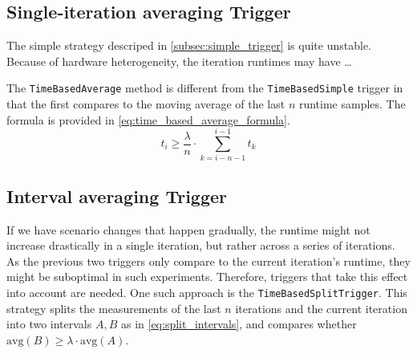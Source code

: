 \subsection{Single-iteration averaging Trigger}
The simple strategy descriped in \autoref{subsec:simple_trigger} is quite unstable. Because of hardware heterogeneity, the iteration runtimes may have …\textellipsis %

The \texttt{TimeBasedAverage} method is different from the \texttt{TimeBasedSimple} trigger in that the first compares to the  moving average of the last $n$ runtime samples. The formula is provided in \eqref{eq:time_based_average_formula}. 
\begin{equation}
	t_i \ge \frac{\lambda}{n}\cdot \sum_{k=i-n-1}^{i-1}t_{k}\label{eq:time_based_average_formula}
\end{equation}

%			


\subsection{Interval averaging Trigger}
If we have scenario changes that happen gradually, the runtime might not increase drastically in a single iteration, but rather across a series of iterations. As the previous two triggers only compare to the current iteration's runtime, they might be suboptimal in such experiments. Therefore, triggers that take this effect into account are needed.
One such approach is the \texttt{TimeBasedSplitTrigger}.
This strategy splits the measurements of the last $n$ iterations and the current iteration into two intervals $A, B$ as in \eqref{eq:split_intervals}, and compares whether $\text{avg}(B)\ge \lambda\cdot \text{avg}(A)$.

